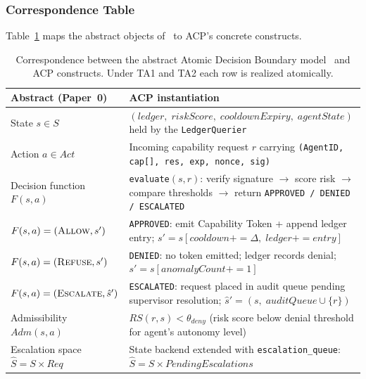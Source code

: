 \documentclass[11pt]{article}
\theoremstyle{definition}
\begin{document}
\subsubsection*{Correspondence Table}

Table~\ref{tab:refinement} maps the abstract objects of~\cite{fernandez2026a}
to ACP's concrete constructs.

\begin{table}[h!]
\centering
\small
\begin{tabular}{@{}p{4.0cm}p{7.8cm}@{}}
\toprule
\textbf{Abstract (Paper~0)} & \textbf{ACP instantiation} \\
\midrule
State $s \in S$ &
  $(\mathit{ledger},\; \mathit{riskScore},\; \mathit{cooldownExpiry},\;
  \mathit{agentState})$ held by the \texttt{LedgerQuerier} \\[4pt]
Action $a \in \mathit{Act}$ &
  Incoming capability request $r$ carrying
  \texttt{(AgentID, cap[], res, exp, nonce, sig)} \\[4pt]
Decision function $F(s,a)$ &
  \texttt{evaluate}$(s,r)$: verify signature $\to$ score risk $\to$
  compare thresholds $\to$ return
  \texttt{APPROVED / DENIED / ESCALATED} \\[4pt]
$F(s,a)=(\textsc{Allow},s')$ &
  \texttt{APPROVED}: emit Capability Token + append ledger entry;
  $s' = s[\mathit{cooldown}{+}{=}\Delta,\;\mathit{ledger}{+}{=}\mathit{entry}]$ \\[4pt]
$F(s,a)=(\textsc{Refuse},s')$ &
  \texttt{DENIED}: no token emitted; ledger records denial;
  $s' = s[\mathit{anomalyCount}{+}{=}1]$ \\[4pt]
$F(s,a)=(\textsc{Escalate},\hat{s}')$ &
  \texttt{ESCALATED}: request placed in audit queue pending supervisor
  resolution; $\hat{s}' = (s,\;\mathit{auditQueue} \cup \{r\})$ \\[4pt]
Admissibility $\mathit{Adm}(s,a)$ &
  $\mathit{RS}(r,s) < \theta_{\mathit{deny}}$ (risk score below denial
  threshold for agent's autonomy level) \\[4pt]
Escalation space $\hat{S}{=}S{\times}\mathit{Req}$ &
  State backend extended with \texttt{escalation\_queue}:
  $\hat{S} = S \times \mathit{PendingEscalations}$ \\
\bottomrule
\end{tabular}
\caption{Correspondence between the abstract Atomic Decision Boundary
  model~\cite{fernandez2026a} and ACP constructs.
  Under TA1 and TA2 each row is realized atomically.}
\label{tab:refinement}
\end{table}
\end{document}

